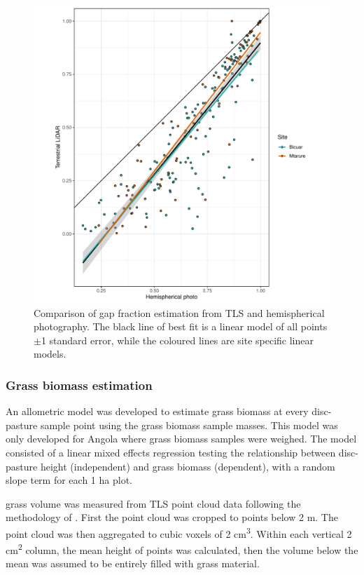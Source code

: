 \documentclass[11pt,a4paper]{article}
\begin{document}
\begin{figure}[H]
\centering
	\includegraphics[width=\textwidth]{tls_hemi_compare}
	\caption{Comparison of gap fraction estimation from TLS and hemispherical photography. The black line of best fit is a linear model of all points $\pm$1 standard error, while the coloured lines are site specific linear models.}
	\label{tls_hemi_compare}
\end{figure}

\subsubsection{Grass biomass estimation}

An allometric model was developed to estimate grass biomass at every disc-pasture sample point using the grass biomass sample masses. This model was only developed for Angola where grass biomass samples were weighed. The model consisted of a linear mixed effects regression testing the relationship between disc-pasture height (independent) and grass biomass (dependent), with a random slope term for each 1 ha plot. 

grass volume was measured from TLS point cloud data following the methodology of \citet{}. First the point cloud was cropped to points below 2 m. The point cloud was then aggregated to cubic voxels of 2 cm\textsuperscript{3}. Within each vertical 2 cm\textsuperscript{2} column, the mean height of points was calculated, then the volume below the mean was assumed to be entirely filled with grass material.
\end{document}
